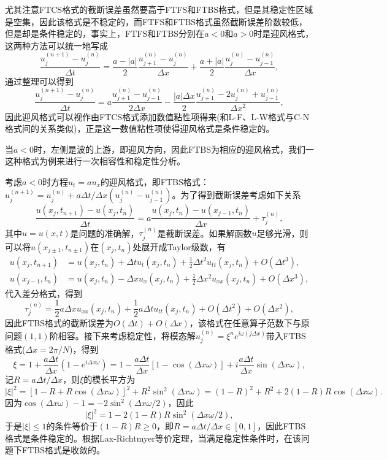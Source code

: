 \documentclass[a4paper,10pt]{ctexart}
\begin{document}
尤其注意FTCS格式的截断误差虽然要高于FTFS和FTBS格式，但是其稳定性区域是空集，因此该格式是不稳定的，而FTFS和FTBS格式虽然截断误差阶数较低，但是却是条件稳定的，事实上，FTFS和FTBS分别在$ a<0 $和$ a>0 $时是迎风格式，这两种方法可以统一地写成
\[
    \frac{u^{(n+1)}_j-u^{(n)}_j}{\Delta t} = \frac{a-|a|}{2} \frac{u^{(n)}_{j+1}-u^{(n)}_{j}}{\Delta x} + \frac{a+|a|}{2} \frac{u^{(n)}_{j}-u^{(n)}_{j-1}}{\Delta x},
\]
通过整理可以得到
\[
    \frac{u^{(n+1)}_j-u^{(n)}_j}{\Delta t} = a \frac{u^{(n)}_{j+1}-u^{(n)}_{j-1}}{2\Delta x} - \frac{|a|\Delta x}{2} \frac{u^{(n)}_{j+1}-2u^{(n)}_j+u^{(n)}_{j-1}}{\Delta x^2},
\]
因此迎风格式可以视作由FTCS格式添加数值粘性项得来(和L-F、L-W格式与C-N格式间的关系类似)，正是这一数值粘性项使得迎风格式是条件稳定的。

当$ a<0 $时，左侧是波的上游，即迎风方向，因此FTBS为相应的迎风格式，我们一这种格式为例来进行一次相容性和稳定性分析。
\begin{example}
    考虑$ a<0 $时方程$ u_t = au_x $的迎风格式，即FTBS格式：$ u^{(n+1)}_j = u^{(n)}_j + a\Delta t / \Delta x (u^{(n)}_j - u^{(n)}_{j-1}) $。为了得到截断误差考虑如下关系
    \[
        \frac{u(x_j,t_{n+1})-u(x_j,t_n)}{\Delta t} = a \frac{u(x_j,t_n)-u(x_{j-1},t_n)}{\Delta x} + \tau_j^{(n)},
    \]
    其中$ u=u(x,t) $是问题的准确解，$ \tau_j^{(n)} $是截断误差。如果解函数$ u $足够光滑，则可以将$ u(x_{j\pm 1},t_{n\pm 1}) $在$ (x_j,t_n) $处展开成Taylor级数，有
    \[
        \begin{aligned}
            u(x_j,t_{n+1}) &= u(x_j,t_n) + \Delta t u_t(x_j,t_n) + \frac{1}{2}\Delta t^2 u_{tt}(x_j,t_n) + O(\Delta t^3),\\
            u(x_{j-1},t_n) &= u(x_j,t_n) - \Delta x u_x(x_j,t_n) + \frac{1}{2}\Delta x^2 u_{xx}(x_j,t_n) + O(\Delta x^3),
        \end{aligned}
    \]
    代入差分格式，得到
    \[
        \tau^{(n)}_j = \frac{1}{2}a\Delta x u_{xx}(x_j,t_n) + \frac{1}{2}a\Delta t u_{tt}(x_j,t_n) + O(\Delta t^2) + O(\Delta x^2) ,
    \]
    因此FTBS格式的截断误差为$ O(\Delta t)+O(\Delta x) $，该格式在任意算子范数下与原问题$ (1,1) $阶相容。接下来考虑稳定性，将模态解$ u^{(n)}_j = \xi^n e^{i\omega (j\Delta x)} $带入FTBS格式($ \Delta x = 2\pi / N $)，得到
    \[
        \xi = 1+ \frac{a\Delta t}{\Delta x}(1-e^{i\Delta x \omega}) = 1- \frac{a\Delta t}{\Delta x}[1-\cos(\Delta x \omega)] + i\frac{a\Delta t}{\Delta x}\sin(\Delta x \omega),
    \]
    记$ R = a \Delta t / \Delta x $，则$ \xi $的模长平方为
    \[
        |\xi|^2 = [1-R +R\cos(\Delta x \omega)]^2 + R^2\sin^2(\Delta x \omega) = (1-R)^2+R^2 + 2(1-R)R\cos(\Delta x \omega).  
    \]
    因为$ \cos(\Delta x \omega) - 1 = -2\sin^2(\Delta x \omega /2) $，因此
    \[
        |\xi|^2 = 1 - 2(1-R)R\sin^2(\Delta x \omega /2),
    \]
    于是$ |\xi|\leqslant 1 $的条件等价于$ (1-R)R\geqslant 0 $，即$ R = a \Delta t / \Delta x \in [0,1] $，因此FTBS格式是条件稳定的。根据Lax-Richtmyer等价定理，当满足稳定性条件时，在该问题下FTBS格式是收敛的。
\end{example}
\end{document}
